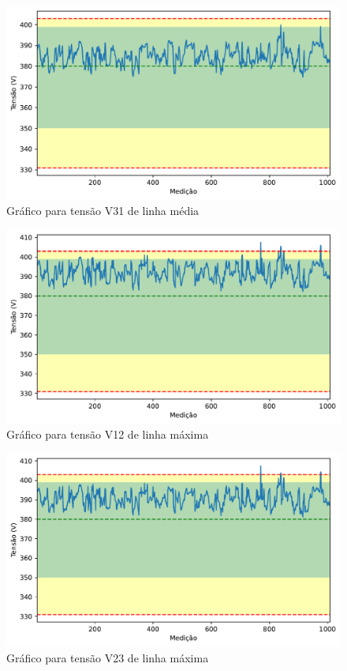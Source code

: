 \begin{figure}[H]
	\centering
	\caption{Gráfico para tensão V31 de linha média}
    \includegraphics[width=16cm]{illustrations/figures/a2_V31_Avg.pdf}
\end{figure}

\begin{figure}[H]
	\centering
	\caption{Gráfico para tensão V12 de linha máxima}
    \includegraphics[width=16cm]{illustrations/figures/a2_V12_Max.pdf}
\end{figure}

\begin{figure}[H]
	\centering
	\caption{Gráfico para tensão V23 de linha máxima}
    \includegraphics[width=16cm]{illustrations/figures/a2_V23_Max.pdf}
\end{figure}

